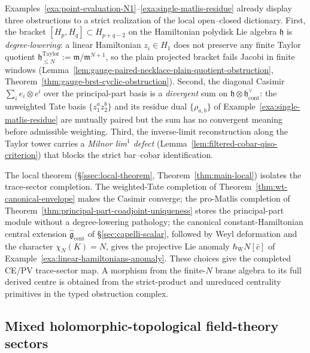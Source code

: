 \documentclass[11pt]{memoir}
\begin{document}
\begin{rmk}
\label{rmk:strict-realization-admissible-completion}
Examples~\ref{exa:point-evaluation-N1}--\ref{exa:single-matlis-residue}
already display three obstructions to a strict realization of the local
open--closed dictionary.  First, the bracket
\([H_p,H_q]\subset H_{p+q-2}\) on the Hamiltonian polydisk Lie algebra
  \(\mathfrak h\) is \emph{degree-lowering}: a linear Hamiltonian
  \(z_i\in H_1\) does not preserve any finite Taylor quotient
  \(\mathfrak h^{\mathrm{Taylor}}_{\leq N}:=\mathfrak m/\mathfrak m^{N+1}\),
  so the plain projected bracket
fails Jacobi in finite windows
(Lemma~\ref{lem:gauge-paired-necklace-plain-quotient-obstruction},
Theorem~\ref{thm:gauge-brst-cyclic-obstruction}).  Second, the
diagonal Casimir
\(\sum_i e_i\otimes e^i\) over the principal-part basis is a
\emph{divergent} sum on \(\mathfrak h\otimes\mathfrak h^\vee_{\mathrm{cont}}\):
the unweighted Tate basis \(\{z_1^az_2^b\}\) and its residue dual
\(\{\rho_{a,b}\}\) of Example~\ref{exa:single-matlis-residue} are
mutually paired but the sum has no convergent meaning before
admissible weighting.  Third, the inverse-limit reconstruction along
the Taylor tower carries a \emph{Milnor lim\(^1\) defect}
(Lemma~\ref{lem:filtered-cobar-qiso-criterion}) that blocks the
strict bar--cobar identification.

The local theorem (\S\ref{ssec:local-theorem},
Theorem~\ref{thm:main-local}) isolates the trace-sector completion.  The
weighted-Tate completion of
Theorem~\ref{thm:wt-canonical-envelope} makes the Casimir converge;
the pro-Matlis completion of
Theorem~\ref{thm:principal-part-coadjoint-uniqueness} stores the
principal-part module without a degree-lowering pathology; the
canonical constant-Hamiltonian central extension
\(\widehat{\mathfrak g}_{\mathrm{cent}}\) of
\S\ref{sec:capelli-scalar}, followed by Weyl deformation and the
character \(\chi_N(K)=N\), gives the projective Lie anomaly
\(\hbar_{\mathrm{W}}N[\bar c]\) of
Example~\ref{exa:linear-hamiltonians-anomaly}.  These choices give the
completed CE/PV trace-sector map.  A morphism from the finite-\(N\)
brane algebra to its full derived centre is obtained from the
strict-product and unreduced centrality primitives in the typed
obstruction complex.
\end{rmk}

\subsection{Mixed holomorphic-topological field-theory sectors}
\end{document}
